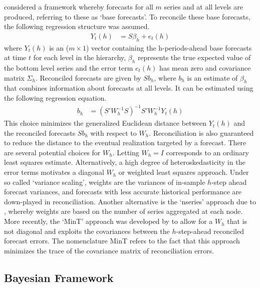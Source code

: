 \documentclass[a4paper,fleqn,11pt]{article}
\begin{document}
\cite{Hyndman2011} considered a framework whereby forecasts for all $m$ series and at all levels are produced, referring to these as `base forecasts'.  To reconcile these base forecasts, the following regression structure was assumed.
\begin{align}
	Y_t(h) &= S\beta_{h} + e_t(h)
	\label{eq:regstruct}
\end{align}
where $Y_t(h)$ is an ($m \times 1$) vector containing the h-periods-ahead base forecasts at time $t$ for each level in the hierarchy, $\beta_{h}$ represents the true expected value of the bottom level series and the error term $e_t(h)$ has mean zero and covariance matrix $\Sigma_h$. Reconciled forecasts are given by $Sb_{h}$, where $b_h$ is an estimate of $\beta_{h}$ that combines information about forecasts at all levels. It can be estimated using the following regression equation.
\begin{align}
	\label{eq:reg}
	b_{h} &= \left(S'W_h^{-1}S \right)^{-1} S'W_h^{-1}Y_t(h)
\end{align}
This choice minimizes the generalized Euclidean distance between $Y_t(h)$ and the reconciled forecasts $Sb_{h}$ with respect to $W_h$. Reconciliation is also guaranteed to reduce the distance to the eventual realization targeted by a forecast. There are several potential choices for $W_h$. Letting $W_h=I$ corresponds to an ordinary least squares estimate.  Alternatively, a high degree of heteroskedasticity in the error terms motivates a diagonal $W_h$ or weighted least squares approach. Under so called `variance scaling', weights are the variances of in-sample $h$-step ahead forecast variances, and forecasts with less accurate historical performance are down-played in reconciliation.  Another alternative is the `nseries' approach due to \cite{Athanasopoulos2017}, whereby weights are based on the number of series aggregated at each node.  More recently, the `MinT' approach was developed by \cite{Wickramasuriya2015} to allow for a $W_h$ that is not diagonal and exploits the covariances between the $h$-step-ahead reconciled forecast errors. The nomenclature MinT refers to the fact that this approach minimizes the trace of the covariance matrix of reconciliation errors.\\



\subsection{Bayesian Framework}
\label{sec:model}
\end{document}
